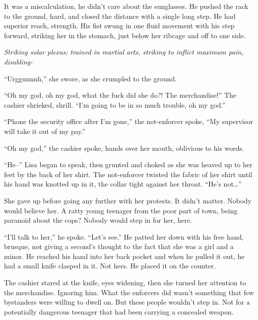It was a miscalculation, he didn't care about the sunglasses.  He pushed the rack to the ground, hard, and closed the distance with a single long step.  He had superior reach, strength.  His fist swung in one fluid movement with his step forward, striking her in the stomach, just below her ribcage and off to one side.



\emph{Striking solar plexus; trained in martial arts, striking to inflict maximum pain, disabling-}



``Urggunnnh,'' she swore, as she crumpled to the ground.



``Oh my god, oh my god, what the fuck did she do?!  The merchandise!'' The cashier shrieked, shrill.  ``I'm going to be in so much trouble, oh my god.''



``Phone the security office after I'm gone,'' the not-enforcer spoke, ``My supervisor will take it out of my pay.''



``Oh my god,'' the cashier spoke, hands over her mouth, oblivious to his words.



``He--'' Lisa began to speak, then grunted and choked as she was heaved up to her feet by the back of her shirt.  The not-enforcer twisted the fabric of her shirt until his hand was knotted up in it, the collar tight against her throat.  ``He's not\ldots''



She gave up before going any further with her protests.  It didn't matter.  Nobody would believe her.  A ratty young teenager from the poor part of town, being paranoid about the cops?  Nobody would step in for her, here.



``I'll talk to her,'' he spoke.  ``Let's see.''  He patted her down with his free hand, brusque, not giving a second's thought to the fact that she was a girl and a minor.  He reached his hand into her back pocket and when he pulled it out, he had a small knife clasped in it.  Not hers.  He placed it on the counter.



The cashier stared at the knife, eyes widening, then she turned her attention to the merchandise.  Ignoring him.  What the enforcers did wasn't something that few bystanders were willing to dwell on.  But these people wouldn't step in.  Not for a potentially dangerous teenager that had been carrying a concealed weapon.



